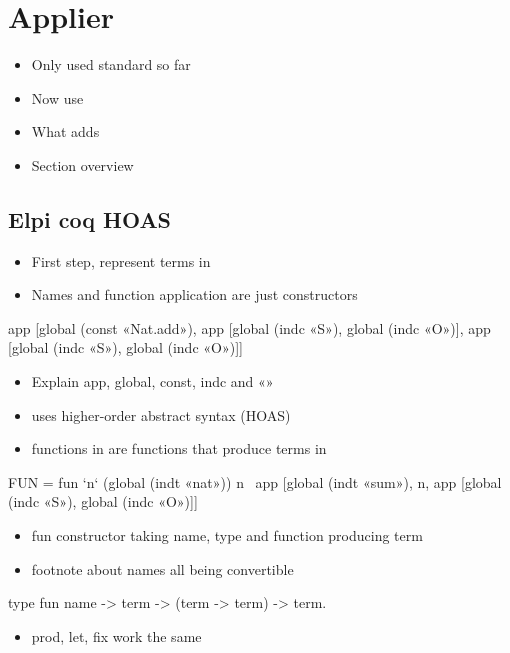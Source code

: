 \documentclass[thesis.tex]{subfiles}
\begin{document}
{{\section{Applier}\label{ssec:applier}
\begin{itemize}
  \item Only used standard \elpi so far
  \item Now use \ce
  \item What \ce adds
  \item Section overview
\end{itemize}


\subsection{Elpi coq HOAS}
\begin{itemize}
  \item First step, represent \coq terms in \elpi
  \item Names and function application are just constructors
\end{itemize}
\begin{elpicode}
  app [global (const «Nat.add»), 
      app [global (indc «S»), global (indc «O»)], 
      app [global (indc «S»), global (indc «O»)]]
\end{elpicode}
\begin{itemize}
  \item Explain app, global, const, indc and «»
\end{itemize}

\begin{itemize}
  \item \ce uses higher-order abstract syntax (HOAS)
  \item functions in \coq are functions that produce terms in \ce
\end{itemize}
\begin{elpicode}
  FUN = fun `n` (global (indt «nat»)) n \ 
          app [global (indt «sum»), 
              n, 
              app [global (indc «S»), global (indc «O»)]]
\end{elpicode}
\begin{itemize}
  \item fun constructor taking name, type and function producing term
  \item footnote about names all being convertible
\end{itemize}
\begin{elpicode}
  type fun  name -> term -> (term -> term) -> term.
\end{elpicode}
\begin{itemize}
  \item prod, let, fix work the same
\end{itemize}


}}
\end{document}
